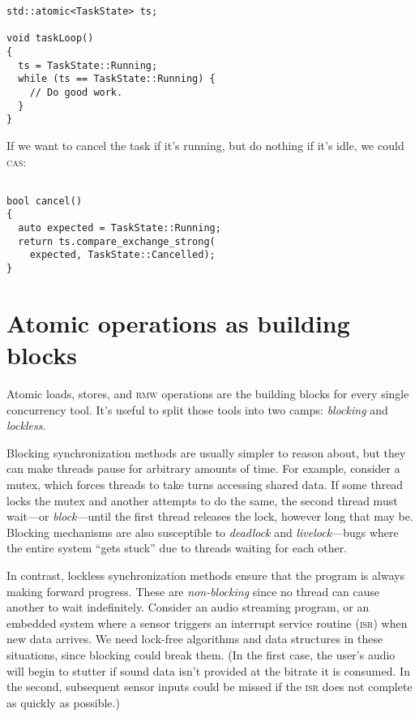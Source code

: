 \documentclass[fontsize=\bodyfontsize, numbers=endperiod]{scrartcl}
\newcommand{\codesize}{\fontsize{\bodyfontsize}{\bodybaselineskip}}
\newcommand{\introduce}[1]{\textit{#1}}
\newenvironment{colfigure}
  {\par\vspace{1\baselineskip minus 0.5\baselineskip}\noindent\minipage{\linewidth}}
  {\endminipage\vspace{1\baselineskip minus 0.7\baselineskip}}
\begin{document}
\begin{multicols}{2}
\begin{colfigure}
\begin{verbatim}
std::atomic<TaskState> ts;

void taskLoop()
{
  ts = TaskState::Running;
  while (ts == TaskState::Running) {
    // Do good work.
  }
}
\end{verbatim}
\end{colfigure}
If we want to cancel the task if it's running, but do nothing if it's idle,
we could \textsc{cas}:
\begin{colfigure}
\begin{verbatim}

bool cancel()
{
  auto expected = TaskState::Running;
  return ts.compare_exchange_strong(
    expected, TaskState::Cancelled);
}
\end{verbatim}
\end{colfigure}

\section{Atomic operations as building blocks}

Atomic loads, stores, and \textsc{rmw} operations are the building
blocks for every single concurrency tool.
It's useful to split those tools into two camps:
\introduce{blocking} and \introduce{lockless}.

Blocking synchronization methods are usually simpler to reason about,
but they can make threads pause for arbitrary amounts of time.
For example, consider a mutex,
which forces threads to take turns accessing shared data.
If some thread locks the mutex
and another attempts to do the same,
the second thread must wait---or \introduce{block}---until
the first thread releases the lock,
however long that may be.
Blocking mechanisms are also susceptible to \introduce{deadlock} and
\introduce{livelock}---bugs where the entire system ``gets stuck''
due to threads waiting for each other.

In contrast, lockless synchronization methods
ensure that the program is always making forward progress.
These are \introduce{non-blocking}
since no thread can cause another to wait indefinitely.
Consider an audio streaming program,
or an embedded system where a sensor triggers an interrupt service routine
\textsc{(isr)} when new data arrives.
We need lock-free algorithms and data structures in these situations,
since blocking could break them.
(In the first case, the user's audio will begin to stutter if sound data
isn't provided at the bitrate it is consumed.
In the second, subsequent sensor inputs could be missed if the \textsc{isr}
does not complete as quickly as possible.)


\end{multicols}
\end{document}
